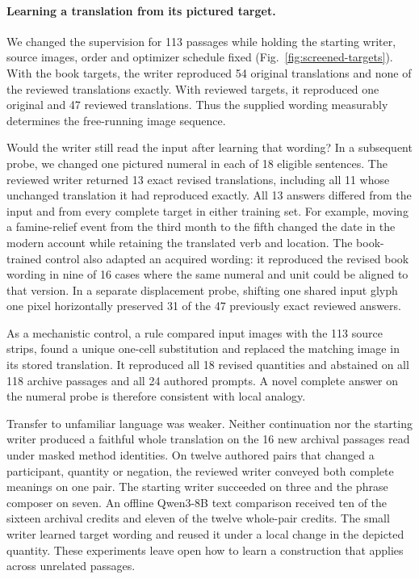 \paragraph{Learning a translation from its pictured target.}
We changed the supervision for 113 passages while holding the starting writer, source images, order and optimizer schedule fixed (Fig.~\ref{fig:screened-targets}). With the book targets, the writer reproduced 54 original translations and none of the reviewed translations exactly. With reviewed targets, it reproduced one original and 47 reviewed translations. Thus the supplied wording measurably determines the free-running image sequence.

Would the writer still read the input after learning that wording? In a subsequent probe, we changed one pictured numeral in each of 18 eligible sentences. The reviewed writer returned 13 exact revised translations, including all 11 whose unchanged translation it had reproduced exactly. All 13 answers differed from the input and from every complete target in either training set. For example, moving a famine-relief event from the third month to the fifth changed the date in the modern account while retaining the translated verb and location. The book-trained control also adapted an acquired wording: it reproduced the revised book wording in nine of 16 cases where the same numeral and unit could be aligned to that version. In a separate displacement probe, shifting one shared input glyph one pixel horizontally preserved 31 of the 47 previously exact reviewed answers.

As a mechanistic control, a rule compared input images with the 113 source strips, found a unique one-cell substitution and replaced the matching image in its stored translation. It reproduced all 18 revised quantities and abstained on all 118 archive passages and all 24 authored prompts. A novel complete answer on the numeral probe is therefore consistent with local analogy.

Transfer to unfamiliar language was weaker. Neither continuation nor the starting writer produced a faithful whole translation on the 16 new archival passages read under masked method identities. On twelve authored pairs that changed a participant, quantity or negation, the reviewed writer conveyed both complete meanings on one pair. The starting writer succeeded on three and the phrase composer on seven. An offline Qwen3-8B text comparison received ten of the sixteen archival credits and eleven of the twelve whole-pair credits. The small writer learned target wording and reused it under a local change in the depicted quantity. These experiments leave open how to learn a construction that applies across unrelated passages.
